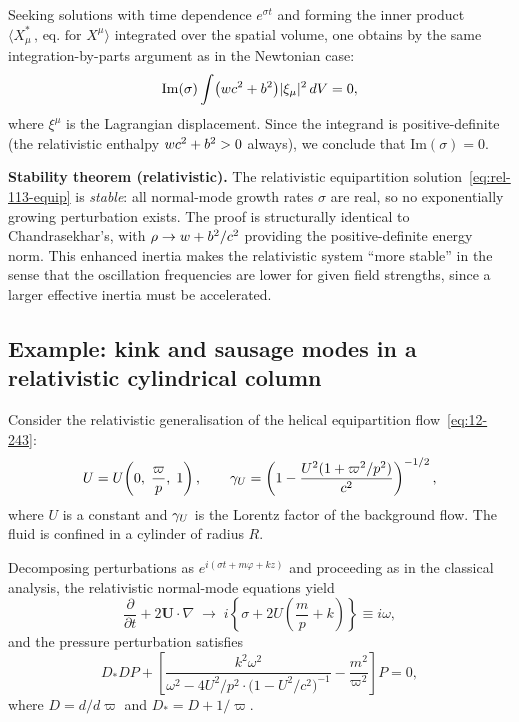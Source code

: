 Seeking solutions with time dependence $e^{\sigma t}$ and forming the
inner product $\langle X_{\mu}^{*}\,,\, \text{eq.\ for }X^{\mu}\rangle$
integrated over the spatial volume, one obtains by the same
integration-by-parts argument as in the Newtonian case:
\begin{equation}
\label{eq:rel-113-imsigma}
\mathrm{Im}(\sigma)\int\bigl(w c^{2}+b^{2}\bigr)
  |\xi_{\mu}|^{2}\,dV = 0,
\end{equation}
where $\xi^{\mu}$ is the Lagrangian displacement.  Since the
integrand is positive-definite (the relativistic enthalpy
$w c^{2}+b^{2} > 0$ always), we conclude that
$\mathrm{Im}(\sigma) = 0$.

\begin{relcorrection}
\textbf{Stability theorem (relativistic).}
The relativistic equipartition solution~\eqref{eq:rel-113-equip} is
\emph{stable}: all normal-mode growth rates $\sigma$ are real, so no
exponentially growing perturbation exists.  The proof is structurally
identical to Chandrasekhar's, with $\rho \to w + b^{2}/c^{2}$
providing the positive-definite energy norm.  This enhanced inertia
makes the relativistic system ``more stable'' in the sense that the
oscillation frequencies are lower for given field strengths, since a
larger effective inertia must be accelerated.
\end{relcorrection}

\subsection{Example: kink and sausage modes in a relativistic
cylindrical column}
\label{sec:rel-113-example}

Consider the relativistic generalisation of the helical equipartition
flow~\eqref{eq:12-243}:
\begin{equation}
\label{eq:rel-113-U}
U = U\!\left(0,\;\frac{\varpi}{p},\;1\right),
\qquad
\gamma_{U} = \left(1 - \frac{U^{2}(1+\varpi^{2}/p^{2})}{c^{2}}
  \right)^{-1/2},
\end{equation}
where $U$ is a constant and $\gamma_{U}$ is the Lorentz factor of the
background flow.  The fluid is confined in a cylinder of radius $R$.

Decomposing perturbations as $e^{i(\sigma t + m\varphi + kz)}$ and
proceeding as in the classical analysis, the relativistic normal-mode
equations yield
\begin{equation}
\label{eq:rel-113-omega}
\frac{\partial}{\partial t}
  + 2\mathbf{U}\cdot\nabla
  \;\longrightarrow\;
  i\!\left\{\sigma + 2U\!\left(\frac{m}{p}+k\right)\right\}
  \equiv i\omega,
\end{equation}
and the pressure perturbation satisfies
\begin{equation}
\label{eq:rel-113-Peq}
D_{*}DP
  + \left[\frac{k^{2}\omega^{2}}
    {\omega^{2} - 4U^{2}/p^{2}\cdot\bigl(1 - U^{2}/c^{2}\bigr)^{-1}}
  - \frac{m^{2}}{\varpi^{2}}\right]P = 0,
\end{equation}
where $D = d/d\varpi$ and $D_{*} = D + 1/\varpi$.

